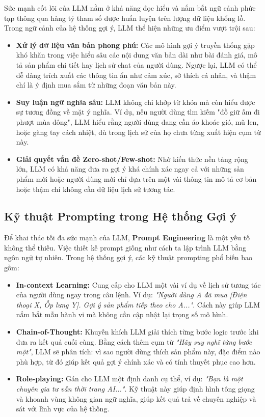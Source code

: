 Sức mạnh cốt lõi của LLM nằm ở khả năng đọc hiểu và nắm bắt ngữ cảnh phức tạp thông qua hàng tỷ tham số được huấn luyện trên lượng dữ liệu khổng lồ. Trong ngữ cảnh của hệ thống gợi ý, LLM thể hiện những ưu điểm vượt trội sau:

\begin{itemize}
    \item \textbf{Xử lý dữ liệu văn bản phong phú:} Các mô hình gợi ý truyền thống gặp khó khăn trong việc hiểu sâu các nội dung văn bản dài như bài đánh giá, mô tả sản phẩm chi tiết hay lịch sử chat của người dùng. Ngược lại, LLM có thể dễ dàng trích xuất các thông tin ẩn như cảm xúc, sở thích cá nhân, và thậm chí là ý định mua sắm từ những đoạn văn bản này.
    \item \textbf{Suy luận ngữ nghĩa sâu:} LLM không chỉ khớp từ khóa mà còn hiểu được sự tương đồng về mặt ý nghĩa. Ví dụ, nếu người dùng tìm kiếm "đồ giữ ấm đi phượt mùa đông", LLM hiểu rằng người dùng đang cần áo khoác gió, mũ len, hoặc găng tay cách nhiệt, dù trong lịch sử của họ chưa từng xuất hiện cụm từ này.
    \item \textbf{Giải quyết vấn đề Zero-shot/Few-shot:} Nhờ kiến thức nền tảng rộng lớn, LLM có khả năng đưa ra gợi ý khá chính xác ngay cả với những sản phẩm mới hoặc người dùng mới chỉ dựa trên một vài thông tin mô tả cơ bản hoặc thậm chí không cần dữ liệu lịch sử tương tác.
\end{itemize}

\subsection{Kỹ thuật Prompting trong Hệ thống Gợi ý}

Để khai thác tối đa sức mạnh của LLM, \textbf{Prompt Engineering} là một yếu tố không thể thiếu. Việc thiết kế prompt giống như cách ta lập trình LLM bằng ngôn ngữ tự nhiên. Trong hệ thống gợi ý, các kỹ thuật prompting phổ biến bao gồm:

\begin{itemize}
    \item \textbf{In-context Learning:} Cung cấp cho LLM một vài ví dụ về lịch sử tương tác của người dùng ngay trong câu lệnh. Ví dụ: \textit{"Người dùng A đã mua [Điện thoại X, Ốp lưng Y]. Gợi ý sản phẩm tiếp theo cho A..."}. Cách này giúp LLM nắm bắt mẫu hành vi mà không cần cập nhật lại trọng số mô hình.
    \item \textbf{Chain-of-Thought:} Khuyến khích LLM giải thích từng bước logic trước khi đưa ra kết quả cuối cùng. Bằng cách thêm cụm từ \textit{"Hãy suy nghĩ từng bước một"}, LLM sẽ phân tích: vì sao người dùng thích sản phẩm này, đặc điểm nào phù hợp, từ đó giúp kết quả gợi ý chính xác và có tính thuyết phục cao hơn.
    \item \textbf{Role-playing:} Gán cho LLM một định danh cụ thể, ví dụ: \textit{"Bạn là một chuyên gia tư vấn thời trang AI..."}. Kỹ thuật này giúp định hình tông giọng và khoanh vùng không gian ngữ nghĩa, giúp kết quả trả về chuyên nghiệp và sát với lĩnh vực của hệ thống.
\end{itemize}


